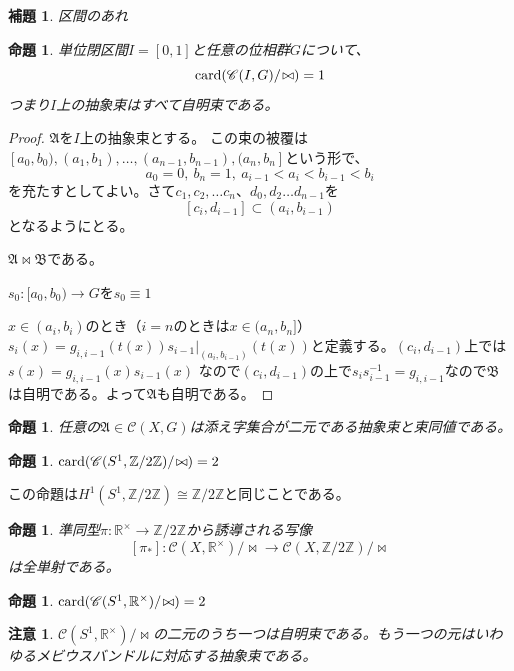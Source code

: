 \documentclass[leqno]{jsarticle}
\newtheorem{prop}[thm]{命題}
\newtheorem{lem}[thm]{補題}
\newtheorem*{cau}{注意}
\newcommand{\zz}{\mathbb{Z}}
\newcommand{\rr}{\mathbb{R}}
\newcommand{\card}{\text{{\rm card}}}
\begin{document}
\begin{lem}
区間のあれ
\end{lem}

\begin{prop}
単位閉区間$I=[0,1]$と任意の位相群$G$について、
\[
\card(\mathscr{C}(I,G)/\!\bowtie)=1
\]
つまり$I$上の抽象束はすべて自明束である。
\end{prop}
\begin{proof}
$\mathfrak{A}$を$I$上の抽象束とする。
この束の被覆は$[a_0, b_0), (a_1, b_1), \dots , (a_{n-1}, b_{n-1}), (a_n, b_n]$という形で、
\[
a_0=0,\  b_n=1, \ a_{i-1}<a_i<b_{i-1}<b_i
\]
を充たすとしてよい。さて$c_1, c_2,\dots c_n$、$d_0, d_2\dots d_{n-1}$を
\[
[c_i, d_{i-1}]\subset (a_i, b_{i-1})
\]
となるようにとる。

$\mathfrak{A}\bowtie \mathfrak{B}$である。


$s_0:[a_0, b_0)\to G$を$s_0\equiv 1$

$x\in (a_i, b_i)$のとき（$i=n$のときは$x\in (a_n, b_n]$）
$s_i(x)=g_{i,i-1}(t(x))s_{i-1}|_{(a_i,b_{i-1})}(t(x))$と定義する。$(c_i, d_{i-1})$上では$s(x)=g_{i,i-1}(x)s_{i-1}(x)$
なので$(c_i, d_{i-1})$の上で$s_{i}s_{i-1}^{-1}=g_{i,i-1}$なので$\mathfrak{B}$は自明である。よって$\mathfrak{A}$も自明である。
\end{proof}

\begin{prop}
任意の$\mathfrak{A}\in \mathscr{C}(X,G)$は添え字集合が二元である抽象束と束同値である。
\end{prop}

\begin{prop}
$\card(\mathscr{C}(S^1, \zz/2\zz)/\!\bowtie)=2$
\end{prop}
この命題は$H^1(S^1, \zz/2\zz)\cong \zz/2\zz$と同じことである。

\begin{prop}
準同型$\pi:\rr^{\times}\to \zz/2\zz$から誘導される写像
\[
[\pi_*]:\mathscr{C}(X,\rr^{\times })/\!\bowtie \to \mathscr{C}(X,\zz/2\zz)/\!\bowtie
\]
は全単射である。
\end{prop}

\begin{prop}
$\card(\mathscr{C}(S^1, \rr^{\times})/\!\bowtie)=2$
\end{prop}

\begin{cau}
$\mathscr{C}(S^1, \rr^{\times})/\!\bowtie$の二元のうち一つは自明束である。もう一つの元はいわゆるメビウスバンドルに対応する抽象束である。
\end{cau}
\end{document}
